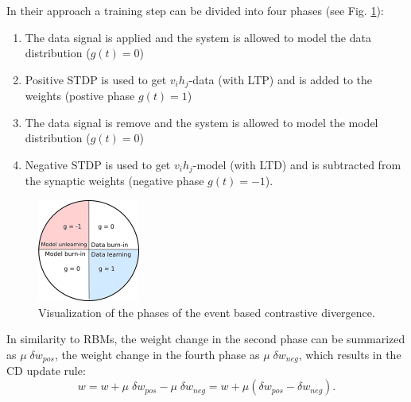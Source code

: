 In their approach a training step can be divided into four phases (see Fig. \ref{fig:ecdph}):
\begin{enumerate}
\item The data signal is applied and the system is allowed to model the data distribution ($g(t)=0$)
\item Positive STDP is used to get $v_i h_j$-data (with LTP) and is added to the weights (postive phase $g(t)=1$)
\item The data signal is remove and the system is allowed to model the model distribution ($g(t)=0$)
\item Negative STDP is used to get $v_i h_j$-model (with LTD) and is subtracted from the synaptic weights (negative phase $g(t)=-1$).
\end{enumerate}


\begin{figure}
	\centering
    	\includegraphics[width=0.3\textwidth]{imgs/eCD11.png} 
    \caption{Visualization of the phases of the event based contrastive divergence.}
	\label{fig:ecdph}
\end{figure}

In similarity to RBMs, the weight change in the second phase can be summarized as $\mu \; \delta w_{pos}$, the weight change in the fourth phase as $\mu \; \delta w_{neg}$, which results in the CD update rule:
\[
w = w +  \mu \; \delta w_{pos} - \mu \; \delta w_{neg} = w +  \mu (\delta w_{pos} - \delta w_{neg}).
\]
 